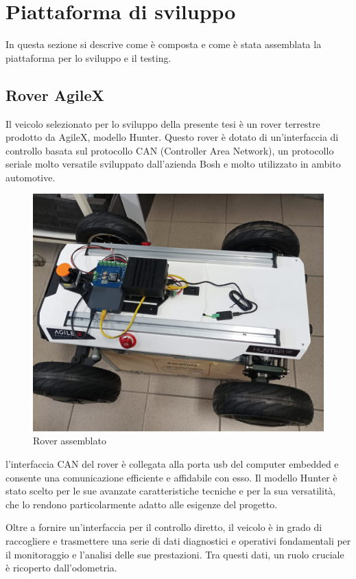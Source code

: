 \section{Piattaforma di sviluppo}
In questa sezione si descrive come è composta e come è stata assemblata la piattaforma per lo sviluppo e il testing.

\subsection{Rover AgileX}
Il veicolo selezionato per lo sviluppo della presente tesi è un rover terrestre prodotto da AgileX, modello Hunter. Questo rover è dotato di un'interfaccia di controllo basata sul protocollo CAN (Controller Area Network), un protocollo seriale molto versatile sviluppato dall'azienda Bosh e molto utilizzato in ambito automotive. 

\begin{figure}[h!]
  \centering
  \includegraphics[width=1\textwidth]{figures/franco.png}
  \caption{Rover assemblato}
  \label{Rover assemblato}
\end{figure}

\noindent l'interfaccia CAN del rover è collegata alla porta usb del computer embedded e consente una comunicazione efficiente e affidabile con esso. Il modello Hunter è stato scelto per le sue avanzate caratteristiche tecniche e per la sua versatilità, che lo rendono particolarmente adatto alle esigenze del progetto.

\noindent Oltre a fornire un'interfaccia per il controllo diretto, il veicolo è in grado di raccogliere e trasmettere una serie di dati diagnostici e operativi fondamentali per il monitoraggio e l'analisi delle sue prestazioni. Tra questi dati, un ruolo cruciale è ricoperto dall'odometria. 

